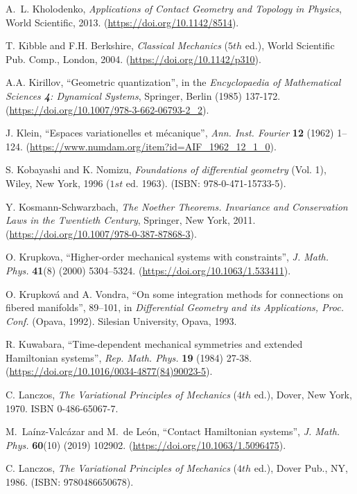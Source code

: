 \documentclass[12pt]{report}
\begin{document}
\begin{thebibliography}{999}
A.~L. Kholodenko,
 {\it Applications of Contact Geometry and Topology in Physics},
 World Scientific, 2013.
(\url{https://doi.org/10.1142/8514}).

T. Kibble and F.H. Berkshire,
{\it Classical Mechanics} ($5th$ ed.),
World Scientific Pub. Comp., London, 2004.
(\url{https://doi.org/10.1142/p310}).

A.A. Kirillov,
``Geometric quantization'',
in the {\sl Encyclopaedia of Mathematical Sciences
{\bf 4}: Dynamical Systems},
Springer, Berlin (1985) 137-172.
(\url{https://doi.org/10.1007/978-3-662-06793-2_2}).

J. Klein,
``Espaces variationelles et m\'{e}canique'',
 \textsl{Ann. Inst. Fourier} {\bf 12} (1962) 1--124.
(\url{https://www.numdam.org/item?id=AIF_1962_12_1_0}).

S. Kobayashi and K. Nomizu,
{\it Foundations of differential geometry} (Vol. 1),
Wiley, New York, 1996 ($1st$ ed. 1963).
(ISBN: 978-0-471-15733-5).

Y. Kosmann-Schwarzbach,
{\it The Noether Theorems. Invariance and Conservation Laws in the Twentieth Century},
Springer, New York, 2011.
(\url{https://doi.org/10.1007/978-0-387-87868-3}).

O. {Krupkova}, 
``Higher-order mechanical systems with constraints'', \textsl{J.  Math. Phys.} 
\textbf{41}(8)  (2000) 5304--5324.
(\url{https://doi.org/10.1063/1.533411}).

O. Krupkov\'a and A. Vondra,
``On some integration methods for connections on fibered manifolds'',
 89--101, in
{\sl  Differential Geometry and its Applications, Proc. Conf.}
 (Opava, 1992).  Silesian University, Opava, 1993.

R. Kuwabara,
``Time-dependent mechanical symmetries and extended Hamiltonian systems'',
{\sl Rep. Math. Phys.} {\bf 19} (1984) 27-38.
(\url{https://doi.org/10.1016/0034-4877(84)90023-5}).

C. Lanczos, {\it The Variational Principles of Mechanics} ($4th$ ed.),  Dover, New York, 1970. ISBN 0-486-65067-7.

M.~{La\'inz-Valc{\'a}zar} and M.~{de Le{\'o}n},
``Contact Hamiltonian systems'',
{\sl J. Math. Phys.} {\bf 60}(10) (2019) 102902.
(\url{https://doi.org/10.1063/1.5096475}).

C. Lanczos,
{\it The Variational Principles of Mechanics} ($4th$ ed.),
Dover Pub., NY, 1986.
(ISBN: 9780486650678).


\end{thebibliography}
\end{document}

